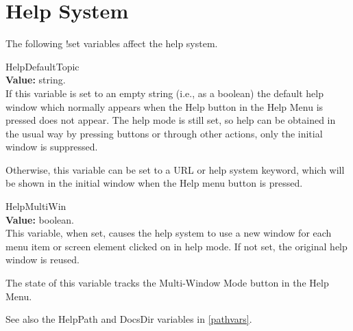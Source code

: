 \section{Help System}

The following {\cb !set} variables affect the help system.

\begin{description}
\item{\et HelpDefaultTopic}\\
{\bf Value:} string.\\
If this variable is set to an empty string (i.e., as a boolean) the
default help window which normally appears when the {\cb Help} button
in the {\cb Help Menu} is pressed does not appear.  The help mode is
still set, so help can be obtained in the usual way by pressing
buttons or through other actions, only the initial window is
suppressed.

Otherwise, this variable can be set to a URL or help system keyword,
which will be shown in the initial window when the {\cb Help} menu
button is pressed.

\item{\et HelpMultiWin}\\
{\bf Value:} boolean.\\
This variable, when set, causes the help system to use a new window
for each menu item or screen element clicked on in help mode.  If not
set, the original help window is reused.

The state of this variable tracks the {\cb Multi-Window Mode} button
in the {\cb Help Menu}.
\end{description}

See also the {\et HelpPath} and {\et DocsDir} variables in
\ref{pathvars}.

